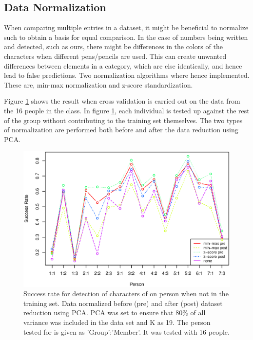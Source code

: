 \subsection{Data Normalization}
\label{sec:DataNormalization}
When comparing multiple entries in a dataset, it might be beneficial to normalize such to obtain a basis for equal comparison.
In the case of numbers being written and detected, such as ours, there might be differences in the colors of the characters when different pens/pencils are used.
This can create unwanted differences between elements in a category, which are else identically, and hence lead to false predictions.
Two normalization algorithms where hence implemented.
These are, min-max normalization and z-score standardization.

Figure \ref{fig:normalization_test_pre-post} shows the result when cross validation is carried out on the data from the 16 people in the class.
In figure \ref{fig:normalization_test_pre-post}, each individual is tested up against the rest of the group without contributing to the training set themselves. 
The two types of normalization are performed both before and after the data reduction using PCA.


\begin{figure}[H]
\centering
\includegraphics[width = 0.95 \textwidth]{graphics/graph_normalization_allppl}
\caption{Success rate for detection of characters of on person when not in the training set. 
Data normalized before (pre) and after (post) dataset reduction using PCA.
PCA was set to ensure that 80\% of all variance was included in the data set and K as 19.
The person tested for is given as 'Group':'Member'.
It was tested with 16 people.}
\label{fig:normalization_test_pre-post}
\end{figure}

